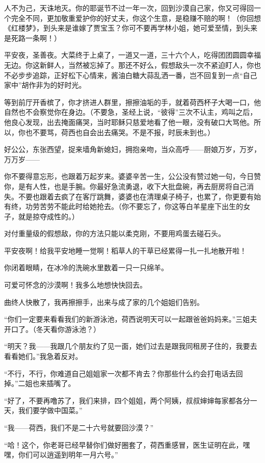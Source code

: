 \par 人不为己，天诛地灭。你的耶诞节不过一年一次，回到沙漠自己家，你又可得回一个完全不同，更加敬重爱护你的好丈夫，你这个生意，是稳赚不赔的啊！（你回想《红楼梦》，到头来是谁嫁了贾宝玉？你可不要再学林小姐，她可爱至情，到头来是死路一条啊！）
\par 平安夜，圣善夜。大菜终于上桌了，一道又一道，三十六个人，吃得团团圆圆幸福无边。你这新鲜人，当然被忘掉了。那还不好么，假想敌头一次不紧迫盯人，你也不必步步追踪，正好松下心情来，酱油白糖大蒜乱洒一番，岂不回复到一点“自己家中”胡作非为的好时光。
\par 等到前厅开香槟了，你才挤进人群里，擦擦油垢的手，就着荷西杯子大喝一口，他自然也不会察觉你在身边。（不要急，圣经上说，“彼得”三次不认主，鸡叫之后，他良心发现，出去掩面痛哭，当时耶稣只慈爱地看了他一眼，没有破口大骂他。所以，你也不要骂，荷西也自会出去痛哭。不是不报，时辰未到也。）
\par 好公公，东张西望，捉来墙角新媳妇，拥抱亲吻，当众高呼——厨娘万岁，万岁，万万岁——
\par 你不要得意忘形，也跟着万起岁来。婆婆辛苦一生，公公没有赞过她一句，今日赞你，是有人性，也是手腕。你最好急流勇退，收下大批盘碗，再去厨房将自己消失。不要也跟着去疯了在客厅跳舞，婆婆也在清理桌子椅子，也累了，你更要有始有终，功劳苦劳不能此时给她抢去。（你不要忘了，你这等白羊星座下出生的女子，就是掠夺成性的。）
\par 对付重量级的假想敌，你的方法只能以柔克刚，不要用鸡蛋去碰石头。
\par 平安夜啊！给我平安地睡一觉啊！稻草人的干草已经累得一扎一扎地散开啦！
\par 你闭着眼睛，在冰冷的洗碗水里数着一只一只绵羊。
\par 可爱可怀念的沙漠啊！我多么地想快快回去。
\par 曲终人快散了，我再擦擦手，出来与成了家的几个姐姐们告别。
\par “你们一定要来看看我们的新游泳池，荷西说明天可以一起跟爸爸妈妈来。”三姐夫开口了。（冬天看你游泳池？）
\par “明天？我——我跟几个朋友约了见一面，她们过去是跟我同租房子住的，我要去看看她们。”我急着反对。
\par “不行，不行，你难道自己姐姐家一次都不肯去？你那些什么约会打电话去回掉。”二姐也来插嘴了。
\par “好了，不要再噜苏了，我们来排，四个姐姐，两个阿姨，叔叔婶婶每家都各分一天，我们要学做中国菜。”
\par “我——荷西，我们不是二十六号就要回沙漠？”
\par “哈！这个，你老哥已经早替你们做好圈套了，荷西重感冒，医生证明在此，嘿嘿，你们可以逍遥到明年一月六号。”
